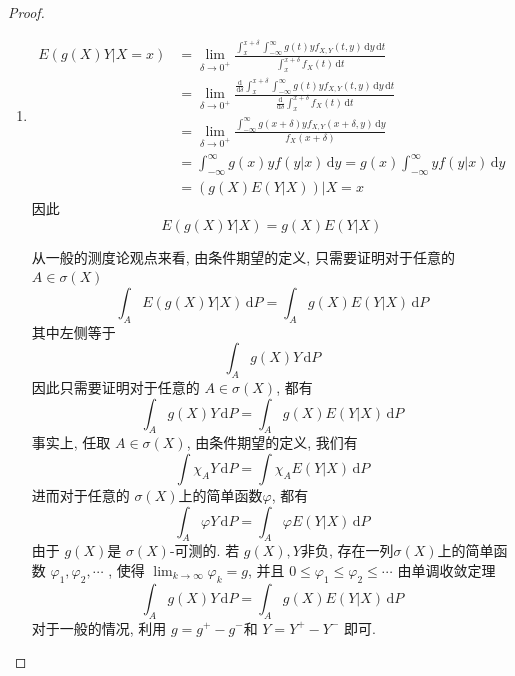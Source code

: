 \documentclass[../main.tex]{subfiles}
\begin{document}
\begin{proof}
     \begin{enumerate}
          \item  \[
         \begin{aligned}
          E\left( g\left( X \right)Y|X = x \right)&= \lim_{ \delta \to 0^{+ }} \frac{\int_{x}^{x+  \delta }\int_{-\infty}^{\infty}g\left( t \right)yf_{X,Y}\left( t,y \right)\,\mathrm{d} y\,\mathrm{d} t   }{\int_{x}^{x+  \delta } f_{X}\left( t \right)\,\mathrm{d} t  }   \\ 
           &= \lim_{ \delta \to 0^{+ }} \frac{\frac{\mathrm{d}}{\mathrm{d} \delta } \int_{x}^{x+  \delta }\int_{-\infty}^{\infty}g\left( t \right)yf_{X,Y}\left( t,y \right)\,\mathrm{d} y\,\mathrm{d} t   }{ \frac{\mathrm{d}}{\mathrm{d} \delta }\int_{x}^{x+  \delta }f_{X}\left( t \right)\,\mathrm{d} t }\\ 
            &=   \lim_{ \delta \to 0^{+ }}\frac{\int_{-\infty}^{\infty}g\left( x+  \delta  \right)yf_{X,Y}\left( x+  \delta ,y \right)\,\mathrm{d} y   }{f_{X}\left( x+  \delta  \right)  }\\ 
            &= \int_{-\infty}^{\infty}g\left( x \right)y f\left( y|x \right) \,\mathrm{d} y= g\left( x \right)\int_{-\infty}^{\infty}yf\left( y|x \right)\,\mathrm{d} y  \\ 
             &=\left(  g\left( X \right) E\left( Y|X \right)    \right)|X= x   
         \end{aligned}
          \]因此 \[
          E\left( g\left( X \right)Y|X  \right)= g\left( X \right)E\left( Y|X \right)   
          \]
          \begin{remark}
               从一般的测度论观点来看, 由条件期望的定义, 只需要证明对于任意的 \(  A\in  \sigma \left( X \right)   \)  \[
               \int_{A}E\left( g\left( X \right)Y|X  \right)\,\mathrm{d} P= \int_{A}g\left( X \right)E\left( Y|X \right)\,\mathrm{d} P   
               \]其中左侧等于 \[
               \int_{A}g\left( X \right)Y \,\mathrm{d} P 
               \]因此只需要证明对于任意的 \(  A\in  \sigma \left( X \right)   \), 都有 \[
               \int_{A}g\left( X \right)Y\,\mathrm{d} P= \int_{A}g\left( X \right)E\left( Y|X \right)\,\mathrm{d} P   
               \] 事实上, 任取 \(  A\in  \sigma \left( X \right)   \), 由条件期望的定义, 我们有 \[
               \int \chi _{A}Y\,\mathrm{d} P= \int \chi _{A}E\left( Y|X \right)\,\mathrm{d} P 
               \] 进而对于任意的 \(   \sigma \left( X \right)   \)上的简单函数\(   \varphi   \), 都有 \[
               \int_{A}  \varphi  Y\,\mathrm{d} P= \int _{A} \varphi E\left( Y|X \right)\,\mathrm{d} P 
               \]  由于 \(  g\left( X \right)   \)是 \(   \sigma \left( X \right)   \)-可测的. 若 \(  g\left( X \right) ,Y  \)非负,  存在一列\(   \sigma \left( X \right)   \)上的简单函数 \(   \varphi _{1}, \varphi _{2},\cdots   \)    , 使得 \(  \lim_{k\to \infty} \varphi _{k}= g  \), 并且 \( 0\le   \varphi _1 \le  \varphi _2 \le \cdots   \)  由单调收敛定理 \[
               \int_{A}g\left( X \right)Y\,\mathrm{d} P= \int _{A}g\left( X \right)E\left( Y|X \right)\,\mathrm{d} P   
               \]  对于一般的情况, 利用 \(  g = g^{+ }- g^{-}  \)和 \(  Y= Y^{+ }-Y^{-}  \)  即可.
          \end{remark}


\end{enumerate}
\end{proof}
\end{document}
